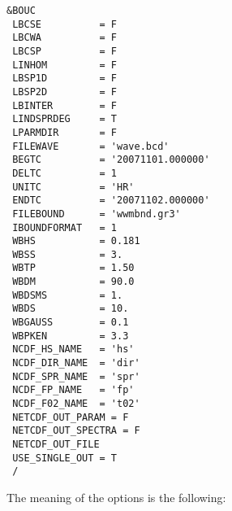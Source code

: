 \documentclass[12pt]{amsart}
\begin{document}
\begin{verbatim}
&BOUC
 LBCSE          = F  
 LBCWA          = F  
 LBCSP          = F  
 LINHOM         = F  
 LBSP1D         = F   
 LBSP2D         = F   
 LBINTER        = F   
 LINDSPRDEG     = T   
 LPARMDIR       = F   
 FILEWAVE       = 'wave.bcd'        
 BEGTC          = '20071101.000000' 
 DELTC          = 1                 
 UNITC          = 'HR'              
 ENDTC          = '20071102.000000'
 FILEBOUND      = 'wwmbnd.gr3'  
 IBOUNDFORMAT   = 1     
 WBHS           = 0.181         
 WBSS           = 3.            
 WBTP           = 1.50         
 WBDM           = 90.0         
 WBDSMS         = 1.           
 WBDS           = 10.          
 WBGAUSS        = 0.1          
 WBPKEN         = 3.3        
 NCDF_HS_NAME   = 'hs'       
 NCDF_DIR_NAME  = 'dir'      
 NCDF_SPR_NAME  = 'spr'      
 NCDF_FP_NAME   = 'fp'       
 NCDF_F02_NAME  = 't02'      
 NETCDF_OUT_PARAM = F   
 NETCDF_OUT_SPECTRA = F 
 NETCDF_OUT_FILE        
 USE_SINGLE_OUT = T  
 /
\end{verbatim}
The meaning of the options is the following:
\end{document}
